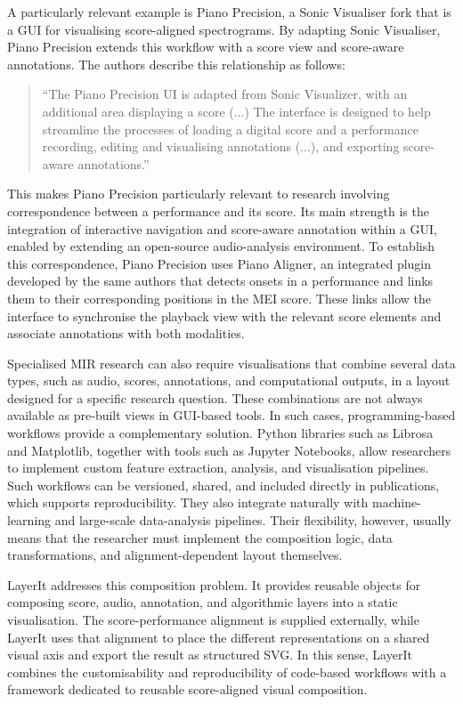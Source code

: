 A particularly relevant example is Piano Precision, a Sonic Visualiser fork that is a GUI for visualising score-aligned spectrograms. By adapting Sonic Visualiser, Piano Precision extends this workflow with a score view and score-aware annotations. The authors describe this relationship as follows:

\begin{quotation}
``The Piano Precision UI is adapted from Sonic Visualizer, with an additional area displaying a score (...) The interface is designed to help streamline the processes of loading a digital score and a performance recording, editing and visualising annotations (...), and exporting score-aware annotations.''\cite{jiangPIANOPRECISIONADVANCING2025}
\end{quotation}

This makes Piano Precision particularly relevant to research involving correspondence between a performance and its score. Its main strength is the integration of interactive navigation and score-aware annotation within a GUI, enabled by extending an open-source audio-analysis environment. To establish this correspondence, Piano Precision uses Piano Aligner, an integrated plugin developed by the same authors that detects onsets in a performance and links them to their corresponding positions in the MEI score. These links allow the interface to synchronise the playback view with the relevant score elements and associate annotations with both modalities.

Specialised MIR research can also require visualisations that combine several data types, such as audio, scores, annotations, and computational outputs, in a layout designed for a specific research question. These combinations are not always available as pre-built views in GUI-based tools. In such cases, programming-based workflows provide a complementary solution. Python libraries such as Librosa and Matplotlib, together with tools such as Jupyter Notebooks, allow researchers to implement custom feature extraction, analysis, and visualisation pipelines. Such workflows can be versioned, shared, and included directly in publications, which supports reproducibility. They also integrate naturally with machine-learning and large-scale data-analysis pipelines. Their flexibility, however, usually means that the researcher must implement the composition logic, data transformations, and alignment-dependent layout themselves.

LayerIt addresses this composition problem. It provides reusable objects for composing score, audio, annotation, and algorithmic layers into a static visualisation. The score-performance alignment is supplied externally, while LayerIt uses that alignment to place the different representations on a shared visual axis and export the result as structured SVG. In this sense, LayerIt combines the customisability and reproducibility of code-based workflows with a framework dedicated to reusable score-aligned visual composition.

